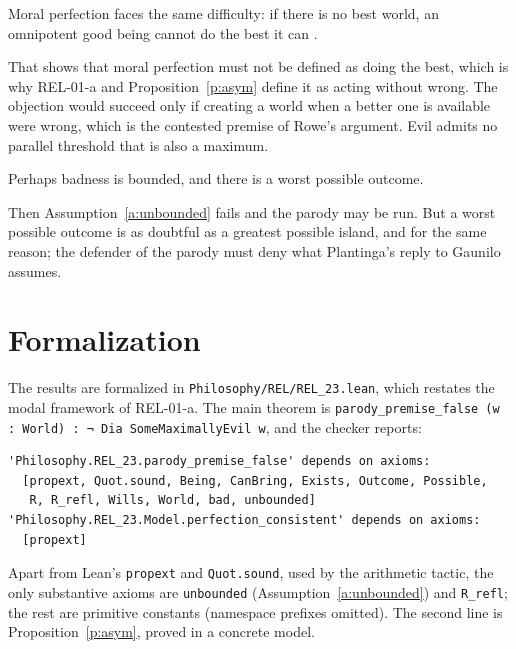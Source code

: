 \documentclass{situationist-preprint}
\begin{document}
\begin{objection}
Moral perfection faces the same difficulty: if there is no best world, an omnipotent good being cannot do the best it can \citep{Rowe2004}.
\end{objection}

\begin{reply}
That shows that moral perfection must not be defined as doing the best, which is why REL-01-a and Proposition~\ref{p:asym} define it as acting without wrong. The objection would succeed only if creating a world when a better one is available were wrong, which is the contested premise of Rowe's argument. Evil admits no parallel threshold that is also a maximum.
\end{reply}

\begin{objection}
Perhaps badness is bounded, and there is a worst possible outcome.
\end{objection}

\begin{reply}
Then Assumption~\ref{a:unbounded} fails and the parody may be run. But a worst possible outcome is as doubtful as a greatest possible island, and for the same reason; the defender of the parody must deny what Plantinga's reply to Gaunilo assumes.
\end{reply}

\section{Formalization}

The results are formalized in \nolinkurl{Philosophy/REL/REL_23.lean}, which restates the modal framework of REL-01-a. The main theorem is \texttt{parody\_premise\_false (w : World) : ¬ Dia SomeMaximallyEvil w}, and the checker reports:

\begin{lstlisting}
'Philosophy.REL_23.parody_premise_false' depends on axioms:
  [propext, Quot.sound, Being, CanBring, Exists, Outcome, Possible,
   R, R_refl, Wills, World, bad, unbounded]
'Philosophy.REL_23.Model.perfection_consistent' depends on axioms:
  [propext]
\end{lstlisting}

Apart from Lean's \texttt{propext} and \texttt{Quot.sound}, used by the arithmetic tactic, the only substantive axioms are \texttt{unbounded} (Assumption~\ref{a:unbounded}) and \texttt{R\_refl}; the rest are primitive constants (namespace prefixes omitted). The second line is Proposition~\ref{p:asym}, proved in a concrete model.
\end{document}
